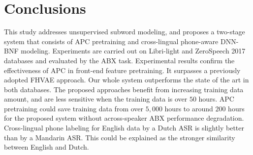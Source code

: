 \documentclass[a4paper]{article}
\begin{document}

\section{Conclusions}
This study addresses unsupervised subword modeling, and proposes a two-stage system that consists of APC pretraining and cross-lingual phone-aware DNN-BNF modeling.  
Experiments are carried out on Libri-light and ZeroSpeech 2017 databases and evaluated by the ABX task. Experimental results confirm the effectiveness of APC in front-end feature pretraining. It surpasses a previously adopted FHVAE approach. Our whole system outperforms the state of the art in both databases. The proposed approaches benefit from increasing training data amount, and are less sensitive when the training data is over $50$ hours. APC pretraining could save training data from over $5,000$ hours to around $200$ hours for the proposed system without across-speaker ABX performance degradation.  
Cross-lingual phone labeling for English data by a Dutch ASR is slightly better than by a Mandarin ASR. This could be explained as the stronger similarity between English and Dutch.  









\end{document}
